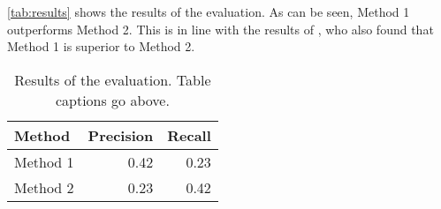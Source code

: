 \lipsum[2-3]

\autoref{tab:results} shows the results of the evaluation.
As can be seen, Method 1 outperforms Method 2.
This is in line with the results of \citet{phdthesis-kinder}, who also found that Method 1 is superior to Method 2.

\begin{table}[t]
    \centering
    \caption{Results of the evaluation. Table captions go above.}
    \label{tab:results}
    \begin{tabularx}{.7\linewidth}{Xrr}
        \toprule
        \textbf{Method} & \textbf{Precision} & \textbf{Recall} \\
        \midrule
        Method 1 & 0.42 & 0.23 \\
        Method 2 & 0.23 & 0.42 \\
        \bottomrule
    \end{tabularx}
\end{table}

\lipsum[2-3]

